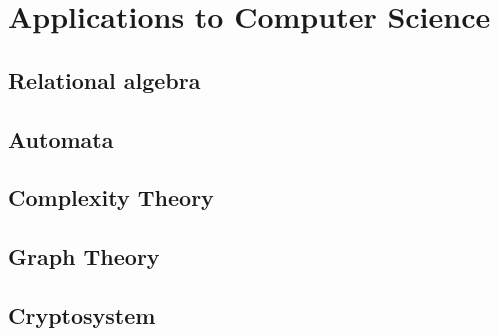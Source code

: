 \documentclass{report}
\theoremstyle{break}
\begin{document}
	\part{Applications to Computer Science}
	
		\chapter{Relational algebra}
			
		
		\chapter{Automata}
			
		
		\chapter{Complexity Theory}
			
		
		\chapter{Graph Theory}
		    
		
		\chapter{Cryptosystem}
			
\end{document}
